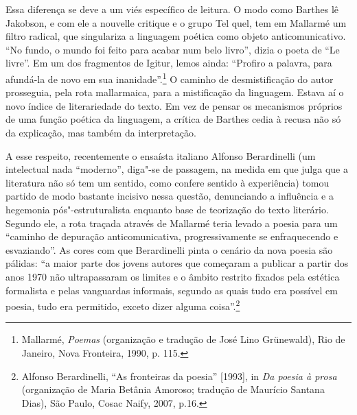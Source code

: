 Essa diferença se deve a um viés específico de leitura. O modo como
Barthes lê Jakobson, e com ele a nouvelle critique e o grupo Tel quel,
tem em Mallarmé um filtro radical, que singulariza a linguagem poética
como objeto anticomunicativo. ``No fundo, o mundo foi feito para acabar
num belo livro'', dizia o poeta de ``Le livre''. Em um dos fragmentos de
Igitur, lemos ainda: ``Profiro a palavra, para afundá-la de novo em sua
inanidade''.\footnote{Mallarmé, \emph{Poemas} (organização e tradução de
  José Lino Grünewald), Rio de Janeiro, Nova Fronteira, 1990, p. 115.} O
caminho de desmistificação do autor prosseguia, pela rota mallarmaica,
para a mistificação da linguagem. Estava aí o novo índice de
literariedade do texto. Em vez de pensar os mecanismos próprios de uma
função poética da linguagem, a crítica de Barthes cedia à recusa não só
da explicação, mas também da interpretação.

A esse respeito, recentemente o ensaísta italiano Alfonso Berardinelli
(um intelectual nada ``moderno'', diga"-se de passagem, na medida em que
julga que a literatura não só tem um sentido, como confere sentido à
experiência) tomou partido de modo bastante incisivo nessa questão,
denunciando a influência e a hegemonia pós"-estruturalista enquanto base
de teorização do texto literário. Segundo ele, a rota traçada através de
Mallarmé teria levado a poesia para um ``caminho de depuração
anticomunicativa, progressivamente se enfraquecendo e esvaziando''. As
cores com que Berardinelli pinta o cenário da nova poesia são pálidas:
``a maior parte dos jovens autores que começaram a publicar a partir dos
anos 1970 não ultrapassaram os limites e o âmbito restrito fixados pela
estética formalista e pelas vanguardas informais, segundo as quais tudo
era possível em poesia, tudo era permitido, exceto dizer alguma
coisa''.\footnote{Alfonso Berardinelli, ``As fronteiras da poesia''
  {[}1993{]}, in \emph{Da poesia à prosa} (organização de Maria Betânia
  Amoroso; tradução de Maurício Santana Dias), São Paulo, Cosac Naify,
  2007, p.16.}

